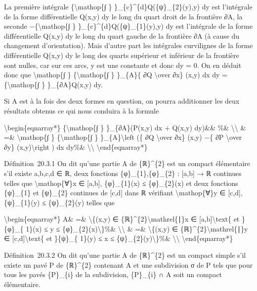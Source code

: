 \documentclass[]{article}
\begin{document}
La première intégrale \{\textbackslash{}mathop\{∫ \}
\}\_\{c\}\^{}\{d\}Q(\{ψ\}\_\{2\}(y),y) dy est l'intégrale de la forme
différentielle Q(x,y) dy le long du quart droit de la frontière ∂A, la
seconde −\{\textbackslash{}mathop\{∫ \}
\}\_\{c\}\^{}\{d\}Q(\{ψ\}\_\{1\}(y),y) dy est l'intégrale de la forme
différentielle Q(x,y) dy le long du quart gauche de la frontière ∂A (à
cause du changement d'orientation). Mais d'autre part les intégrales
curvilignes de la forme différentielle Q(x,y) dy le long des quarts
supérieur et inférieur de la frontière sont nulles, car sur ces arcs, y
est une constante et donc dy = 0. On en déduit donc que
\textbackslash{}mathop\{∫ \} \{\textbackslash{}mathop\{∫ \} \}\_\{A\}\{
∂Q \textbackslash{}over ∂x\} (x,y) dx dy =\{\textbackslash{}mathop\{∫ \}
\}\_\{∂A\}Q(x,y) dy.

Si A est à la fois des deux formes en question, on pourra additionner
les deux résultats obtenus ce qui nous conduira à la formule

\textbackslash{}begin\{eqnarray*\} \{\textbackslash{}mathop\{∫ \}
\}\_\{∂A\}(P(x,y) dx + Q(x,y) dy)\&\& \%\&
\textbackslash{}\textbackslash{} \& =\& \textbackslash{}mathop\{∫ \}
\{\textbackslash{}mathop\{∫ \} \}\_\{A\}\textbackslash{}left (\{ ∂Q
\textbackslash{}over ∂x\} (x,y) −\{ ∂P \textbackslash{}over ∂y\}
(x,y)\textbackslash{}right ) dx dy\%\& \textbackslash{}\textbackslash{}
\textbackslash{}end\{eqnarray*\}

Définition~20.3.1 On dit qu'une partie A de \{ℝ\}\^{}\{2\} est un
compact élémentaire s'il existe a,b,c,d ∈ ℝ, deux fonctions
\{φ\}\_\{1\},\{φ\}\_\{2\} : {[}a,b{]} → ℝ continues telles que
\textbackslash{}mathop\{∀\}x ∈ {[}a,b{]}, \{φ\}\_\{1\}(x) ≤
\{φ\}\_\{2\}(x) et deux fonctions \{ψ\}\_\{1\} et \{ψ\}\_\{2\} continues
de {[}c,d{]} dans ℝ vérifiant \textbackslash{}mathop\{∀\}y ∈ {[}c,d{]},
\{ψ\}\_\{1\}(y) ≤ \{ψ\}\_\{2\}(y) telles que

\textbackslash{}begin\{eqnarray*\} A\& =\& \textbackslash{}\{(x,y) ∈
\{ℝ\}\^{}\{2\}\textbackslash{}mathrel\{∣\}x ∈
{[}a,b{]}\textbackslash{}text\{ et \}\{φ\}\_\{ 1\}(x) ≤ y ≤
\{φ\}\_\{2\}(x)\textbackslash{}\}\%\& \textbackslash{}\textbackslash{}
\& =\& \textbackslash{}\{(x,y) ∈
\{ℝ\}\^{}\{2\}\textbackslash{}mathrel\{∣\}y ∈
{[}c,d{]}\textbackslash{}text\{ et \}\{ψ\}\_\{ 1\}(y) ≤ x ≤
\{ψ\}\_\{2\}(y)\textbackslash{}\}\%\& \textbackslash{}\textbackslash{}
\textbackslash{}end\{eqnarray*\}

Définition~20.3.2 On dit qu'une partie A de \{ℝ\}\^{}\{2\} est un
compact simple s'il existe un pavé P de \{ℝ\}\^{}\{2\} contenant A et
une subdivision σ de P tels que pour tous les pavés \{P\}\_\{i\} de la
subdivision, \{P\}\_\{i\} ∩ A soit un compact élémentaire.
\end{document}
